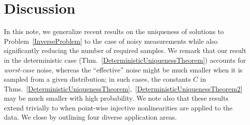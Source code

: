 \documentclass[journal, twocolumn]{IEEEtran}
\begin{document}
\section{Discussion}\label{Discussion}

In this note, we generalize recent results \cite{Hillar15} on the uniqueness of solutions to Problem~\ref{InverseProblem} to the case of noisy measurements while also significantly reducing the number of required samples.
We remark that our result in the deterministic case (Thm.~\ref{DeterministicUniquenessTheorem}) accounts for \emph{worst-case} noise, whereas the ``effective'' noise might be much smaller when it is sampled from a given distribution; in such cases, the constants $C$ in Thms.~\ref{DeterministicUniquenessTheorem},~\ref{DeterministicUniquenessTheorem2} may be much smaller with high probability.
We note also that these results extend trivially to when point-wise injective nonlinearities are applied to the data. We close by outlining  four diverse application areas.

\end{document}
